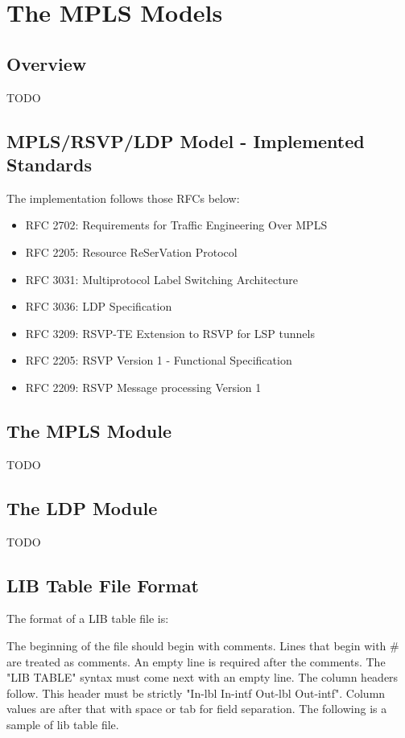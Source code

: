 \chapter{The MPLS Models}
\label{cha:mpls}


\section{Overview}

TODO


\section{MPLS/RSVP/LDP Model - Implemented Standards}

The implementation follows those RFCs below:

\begin{itemize}
  \item RFC 2702: Requirements for Traffic Engineering Over MPLS
  \item RFC 2205: Resource ReSerVation Protocol
  \item RFC 3031: Multiprotocol Label Switching Architecture
  \item RFC 3036: LDP Specification
  \item RFC 3209: RSVP-TE Extension to RSVP for LSP tunnels
  \item RFC 2205: RSVP Version 1 - Functional Specification
  \item RFC 2209: RSVP Message processing Version 1
\end{itemize}

\section{The MPLS Module}

TODO

\section{The LDP Module}

TODO

\section{LIB Table File Format}

The format of a LIB table file is:

The beginning of the file should begin with comments. Lines that begin with \# are treated
as comments. An empty line is required after the comments. The "LIB TABLE"
syntax must come next with an empty line. The column headers follow. This header
must be strictly "In-lbl In-intf Out-lbl Out-intf". Column
values are after that with space or tab for field separation.
The following is a sample of lib table file.

